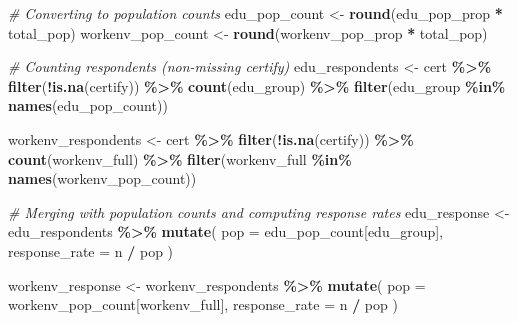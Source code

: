 \documentclass[]{article}
\newenvironment{Shaded}{\begin{snugshade}}{\end{snugshade}}
\newcommand{\AttributeTok}[1]{\textcolor[rgb]{0.13,0.29,0.53}{#1}}
\newcommand{\CommentTok}[1]{\textcolor[rgb]{0.56,0.35,0.01}{\textit{#1}}}
\newcommand{\FunctionTok}[1]{\textcolor[rgb]{0.13,0.29,0.53}{\textbf{#1}}}
\newcommand{\NormalTok}[1]{#1}
\newcommand{\OtherTok}[1]{\textcolor[rgb]{0.56,0.35,0.01}{#1}}
\newcommand{\SpecialCharTok}[1]{\textcolor[rgb]{0.81,0.36,0.00}{\textbf{#1}}}
\begin{document}
\begin{Shaded}
\begin{Highlighting}[]
\CommentTok{\# Converting to population counts}
\NormalTok{edu\_pop\_count }\OtherTok{\textless{}{-}} \FunctionTok{round}\NormalTok{(edu\_pop\_prop }\SpecialCharTok{*}\NormalTok{ total\_pop)}
\NormalTok{workenv\_pop\_count }\OtherTok{\textless{}{-}} \FunctionTok{round}\NormalTok{(workenv\_pop\_prop }\SpecialCharTok{*}\NormalTok{ total\_pop)}

\CommentTok{\# Counting respondents (non{-}missing \textquotesingle{}certify\textquotesingle{})}
\NormalTok{edu\_respondents }\OtherTok{\textless{}{-}}\NormalTok{ cert }\SpecialCharTok{\%\textgreater{}\%}
  \FunctionTok{filter}\NormalTok{(}\SpecialCharTok{!}\FunctionTok{is.na}\NormalTok{(certify)) }\SpecialCharTok{\%\textgreater{}\%}
  \FunctionTok{count}\NormalTok{(edu\_group) }\SpecialCharTok{\%\textgreater{}\%}
  \FunctionTok{filter}\NormalTok{(edu\_group }\SpecialCharTok{\%in\%} \FunctionTok{names}\NormalTok{(edu\_pop\_count))}

\NormalTok{workenv\_respondents }\OtherTok{\textless{}{-}}\NormalTok{ cert }\SpecialCharTok{\%\textgreater{}\%}
  \FunctionTok{filter}\NormalTok{(}\SpecialCharTok{!}\FunctionTok{is.na}\NormalTok{(certify)) }\SpecialCharTok{\%\textgreater{}\%}
  \FunctionTok{count}\NormalTok{(workenv\_full) }\SpecialCharTok{\%\textgreater{}\%}
  \FunctionTok{filter}\NormalTok{(workenv\_full }\SpecialCharTok{\%in\%} \FunctionTok{names}\NormalTok{(workenv\_pop\_count))}

\CommentTok{\# Merging with population counts and computing response rates}
\NormalTok{edu\_response }\OtherTok{\textless{}{-}}\NormalTok{ edu\_respondents }\SpecialCharTok{\%\textgreater{}\%}
  \FunctionTok{mutate}\NormalTok{(}
    \AttributeTok{pop =}\NormalTok{ edu\_pop\_count[edu\_group],}
    \AttributeTok{response\_rate =}\NormalTok{ n }\SpecialCharTok{/}\NormalTok{ pop}
\NormalTok{  )}

\NormalTok{workenv\_response }\OtherTok{\textless{}{-}}\NormalTok{ workenv\_respondents }\SpecialCharTok{\%\textgreater{}\%}
  \FunctionTok{mutate}\NormalTok{(}
    \AttributeTok{pop =}\NormalTok{ workenv\_pop\_count[workenv\_full],}
    \AttributeTok{response\_rate =}\NormalTok{ n }\SpecialCharTok{/}\NormalTok{ pop}
\NormalTok{  )}
\end{Highlighting}
\end{Shaded}
\end{document}
